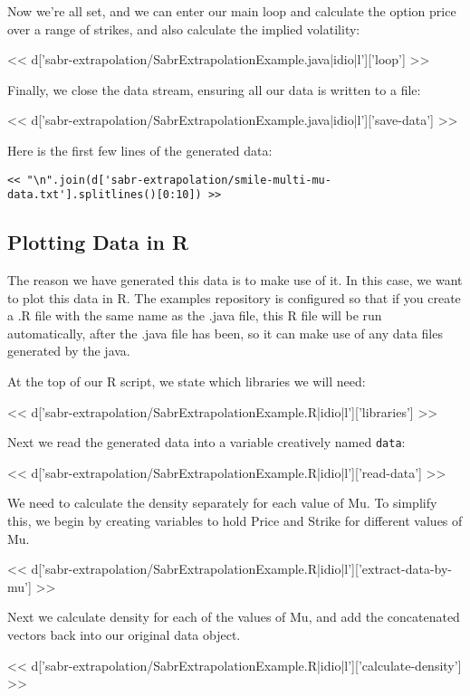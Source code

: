 Now we're all set, and we can enter our main loop and calculate the option
price over a range of strikes, and also calculate the implied volatility:

<< d['sabr-extrapolation/SabrExtrapolationExample.java|idio|l']['loop'] >>

Finally, we close the data stream, ensuring all our data is written to a file:

<< d['sabr-extrapolation/SabrExtrapolationExample.java|idio|l']['save-data'] >>

Here is the first few lines of the generated data:

\begin{Verbatim}
<< "\n".join(d['sabr-extrapolation/smile-multi-mu-data.txt'].splitlines()[0:10]) >>
\end{Verbatim}

\subsection{Plotting Data in R}

The reason we have generated this data is to make use of it. In this case, we
want to plot this data in R. The examples repository is configured so that if
you create a .R file with the same name as the .java file, this R file will
be run automatically, after the .java file has been, so it can make use of any
data files generated by the java.

At the top of our R script, we state which libraries we will need:

<< d['sabr-extrapolation/SabrExtrapolationExample.R|idio|l']['libraries'] >>

Next we read the generated data into a variable creatively named \verb|data|:

<< d['sabr-extrapolation/SabrExtrapolationExample.R|idio|l']['read-data'] >>

We need to calculate the density separately for each value of Mu. To simplify
this, we begin by creating variables to hold Price and Strike for different
values of Mu.

<< d['sabr-extrapolation/SabrExtrapolationExample.R|idio|l']['extract-data-by-mu'] >>

Next we calculate density for each of the values of Mu, and add the
concatenated vectors back into our original data object.

<< d['sabr-extrapolation/SabrExtrapolationExample.R|idio|l']['calculate-density'] >>

